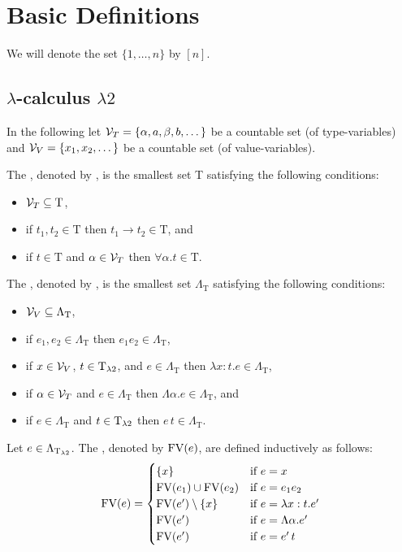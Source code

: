 \section{Basic Definitions}
We will denote the set $\{1,\dots,n\}$ by $\left[n\right]$.
\subsection{$\lambda$-calculus $\lambda2$}
In the following let $\mathcal{V}_T=\{\alpha,a,\beta,b,\dots\}$ be a countable set (of type-variables) and $\mathcal{V}_V=\{x_1,x_2,\dots\}$ be a countable set (of value-variables).
\begin{definition}
	The , denoted by \lambdaTypes{}, is the smallest set T satisfying the following conditions:
	\begin{itemize}
		\item $\mathcal{V}_T\subseteq\text{T}$,
		\item if $t_1,t_2\in\text{T}$ then $t_1\to t_2\in\text{T}$, and
		\item if $t\in\text{T}$ and $\alpha\in\mathcal{V}_T$ then $\forall\alpha.t\in\text{T}$.
	\end{itemize}
	
	The , denoted by \lambdaTerms{}, is the smallest set $\Lambda_\text{T}$ satisfying the following conditions: %
	\begin{itemize}
		\item $\mathcal{V}_V\subseteq\Lambda_\text{T}$,
		\item if $e_1,e_2\in\Lambda_\text{T}$ then $e_1e_2\in\Lambda_\text{T}$,
		\item if $x\in\mathcal{V}_V$, $t\in\text{T}_{\lambda2}$, and $e\in\Lambda_\text{T}$ then $\lambda x:t.e\in\Lambda_\text{T}$,
		\item if $\alpha\in\mathcal{V}_T$ and $e\in\Lambda_\text{T}$ then $\Lambda \alpha.e\in\Lambda_\text{T}$, and
		\item if $e\in\Lambda_\text{T}$ and $t\in\text{T}_{\lambda2}$ then $e\,t\in\Lambda_\text{T}$.
	\end{itemize}
\end{definition}
\begin{definition}
	Let $e\in\Lambda_{\text{T}_{\lambda2}}$. The , denoted by $\text{FV}(e)$, are defined inductively as follows:
	\[\FV(e)=
		\begin{cases}
			\{x\}                 & \text{if $e=x$}                \\ %
			\FV(e_1)\cup\FV(e_2)  & \text{if $e=e_1e_2$}           \\
			\FV(e')\setminus\{x\} & \text{if $e=\lambda x:t.e'$}   \\
			\FV(e')               & \text{if $e=\Lambda\alpha.e'$} \\
			\FV(e')               & \text{if $e=e'\,t$}            \\
		\end{cases}\]
\end{definition}
